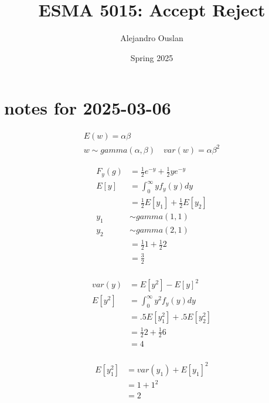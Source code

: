 \documentclass[10pt, oneside]{article}
\title{ESMA 5015: Accept Reject}
\author{Alejandro Ouslan}
\date{Spring 2025}
\begin{document}
\maketitle
\tableofcontents

\vspace{.25in}

\section{notes for 2025-03-06}

\[
	\begin{split}
		E(w) = \alpha \beta \\
		w\sim gamma(\alpha, \beta) \quad var(w) = \alpha \beta^2
	\end{split}
\]


\[
	\begin{split}
		F_y (g) & = \frac{1}{2} e^{-y} + \frac{1}{2} y e^{-y} \\
		E[y]    & = \int_0^\infty y f_y(y) dy                 \\
		        & = \frac{1}{2} E[y_1] + \frac{1}{2} E[y_2]   \\
		y_1     & \sim gamma(1,1)                             \\
		y_2     & \sim gamma(2,1)                             \\
		        & = \frac{1}{2} 1 + \frac{1}{2} 2             \\
		        & = \frac{3}{2}                               \\
	\end{split}
\]


\[
	\begin{split}
		var (y) & = E[y^2] - E[y]^2               \\
		E[y^2]  & = \int_0^\infty y^2 f_y(y) dy   \\
		        & = .5 E[y_1^2] + .5 E[y_2^2]     \\
		        & = \frac{1}{2} 2 + \frac{1}{2} 6 \\
		        & = 4                             \\
	\end{split}
\]

\[
	\begin{split}
		E[y_1^2] & = var(y_1) + E[y_1]^2 \\
		         & = 1 + 1^2             \\
		         & = 2
	\end{split}
\]
\end{document}
